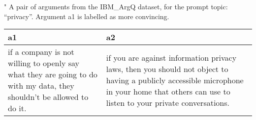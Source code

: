 \centering
\caption{"
              A pair of arguments from the IBM\_ArgQ dataset, 
              for the prompt topic: ``privacy''. 
              Argument a1 is labelled as more convincing.
              }
\begin{tabular}{p{6cm}|p{6cm}}
\toprule
                                                                                                                    a1 &                                                                                                                                                                                            a2 \\
\midrule
 if a company is not willing to openly say what they are going to do with my data, they shouldn't be allowed to do it. &  if you are against information privacy laws, then you should not object to having a publicly accessible microphone in your home that others can use to listen to your private conversations. \\
\bottomrule
\end{tabular}
